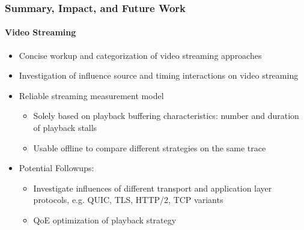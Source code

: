 \documentclass{beamer}
\begin{document}
\begin{frame}
	\frametitle{Summary, Impact, and Future Work}
	\framesubtitle{Video Streaming}

	\begin{itemize}
		\item Concise workup and categorization of video streaming approaches
		\item Investigation of influence source and timing interactions on video streaming
		\item Reliable streaming measurement model
		\begin{itemize}
			\item Solely based on playback buffering characteristics: number and duration of playback stalls
			\item Usable offline to compare different strategies on the same trace
		\end{itemize}
		\item Potential Followups:
		\begin{itemize}
			\item Investigate influences of different transport and application layer protocols, e.g. QUIC, TLS, HTTP/2, TCP variants
			\item QoE optimization of playback strategy

		\end{itemize}
	\end{itemize}
\end{frame}
\end{document}

